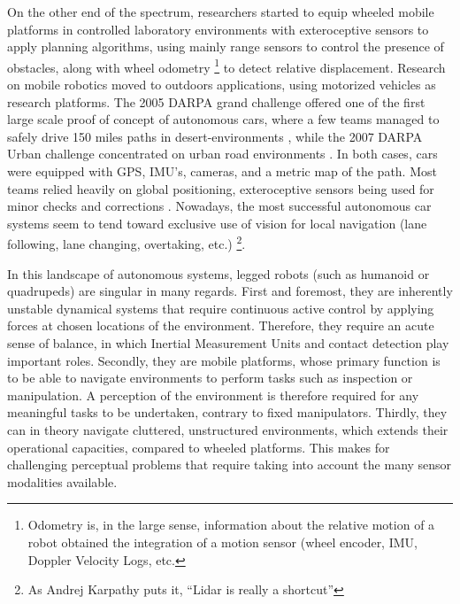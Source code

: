 On the other end of the spectrum, researchers started to equip wheeled mobile platforms in controlled laboratory environments with exteroceptive sensors 
\cite{Nilsson1984ShakeyTR, chatila1985position} to apply planning algorithms, using mainly range sensors to control the presence of obstacles, along with wheel odometry \footnote{Odometry is, in the large sense, information about the relative motion of a robot obtained the integration of a motion sensor (wheel encoder, IMU, Doppler Velocity Logs, etc.}
to detect relative displacement. 
Research on mobile robotics moved to outdoors applications, using motorized vehicles as research platforms. The 2005 DARPA grand challenge
offered one of the first large scale proof of concept of autonomous cars, where a few teams managed to safely drive 150 miles paths in desert-environments 
\cite{thrun2006stanley}, while the 2007 DARPA Urban challenge concentrated on urban road environments \cite{urmson2008autonomous}. In both cases, cars were 
equipped with GPS, IMU's, cameras, and a metric map of the path. Most teams relied heavily on global positioning, exteroceptive sensors being used for 
minor checks and corrections \cite{hillel2014recent}. Nowadays, the most successful autonomous car systems 
seem to tend toward exclusive use of vision for local navigation (lane following, lane changing, overtaking, etc.) \footnote{As Andrej Karpathy puts it, “Lidar is really a shortcut”}. 


In this landscape of autonomous systems, legged robots (such as humanoid 
or quadrupeds) are singular in many regards. 
First and foremost, they are inherently unstable dynamical systems that require continuous active control by applying forces at chosen locations of the environment. 
Therefore, they require an acute sense of balance, in which Inertial Measurement Units and contact detection play important roles. 
Secondly, they are mobile platforms, whose primary function is to be able to navigate environments to perform tasks such as inspection or manipulation.
A perception of the environment is therefore required for any meaningful tasks to be undertaken, contrary to fixed manipulators.
Thirdly, they can in theory navigate cluttered, unstructured environments, which extends their operational capacities, compared to wheeled platforms.
This makes for challenging perceptual problems that require taking into account the many sensor modalities available.

